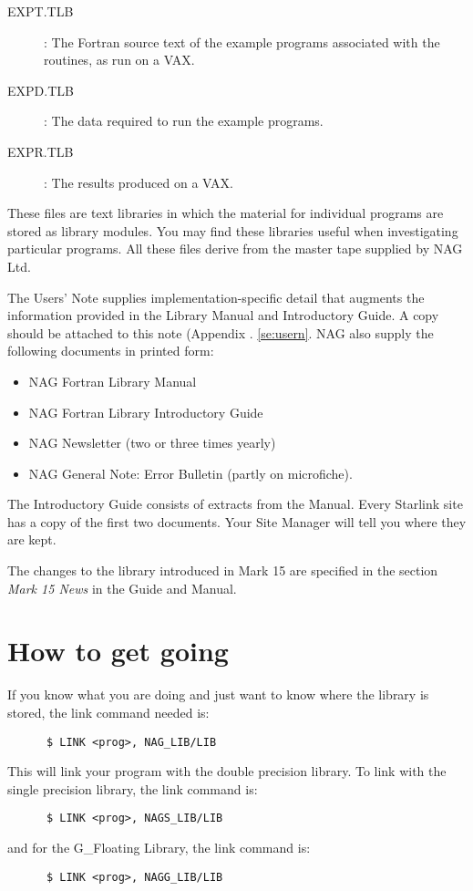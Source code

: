 \begin{description}
\begin{description}

\item [EXPT.TLB] : The Fortran source text of the example programs associated
with the routines, as run on a VAX.

\item [EXPD.TLB] : The data required to run the example programs.

\item [EXPR.TLB] : The results produced on a VAX.

\end{description}
\end{description}

These files are text libraries in which the material for individual programs
are stored as library modules. You may find these libraries useful when
investigating particular programs. All these files derive from the master tape
supplied by NAG Ltd.

The Users' Note supplies implementation-specific detail that augments the
information provided in the Library Manual and Introductory Guide. A copy
should be attached to this note (Appendix . \ref{se:usern}. NAG also supply the
following documents in printed form:

\begin{itemize}
\item NAG Fortran Library Manual
\item NAG Fortran Library Introductory Guide
\item NAG Newsletter (two or three times yearly)
\item NAG General Note: Error Bulletin (partly on microfiche).
\end{itemize}

The Introductory Guide consists of extracts from the Manual. Every Starlink
site has a copy of the first two documents. Your Site Manager will tell you
where they are kept.

The changes to the library introduced in Mark 15 are specified in the section
{\em Mark 15 News} in the Guide and Manual.

\section{How to get going}

If you know what you are doing and just want to know where the library is
stored, the link command needed is:
\begin{verbatim}
      $ LINK <prog>, NAG_LIB/LIB
\end{verbatim}
This will link your program with the double precision library. To link with the
single precision library, the link command is:
\begin{verbatim}
      $ LINK <prog>, NAGS_LIB/LIB
\end{verbatim}
and for the G\_Floating Library, the link command is:
\begin{verbatim}
      $ LINK <prog>, NAGG_LIB/LIB
\end{verbatim}

